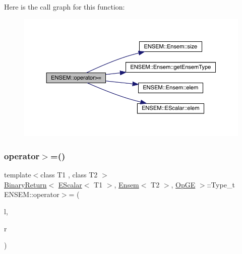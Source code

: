 Here is the call graph for this function\+:\nopagebreak
\begin{figure}[H]
\begin{center}
\leavevmode
\includegraphics[width=350pt]{d1/d9e/group__eensem_gaefcc523be9266958f63fc6b34c2671e8_cgraph}
\end{center}
\end{figure}
\mbox{\label{group__eensem_ga08b4c51fd25a40dd1d20e6138378a63d}} 
\subsubsection{\texorpdfstring{operator$>$=()}{operator>=()}\hspace{0.1cm}{\footnotesize\ttfamily [3/3]}}
{\footnotesize\ttfamily template$<$class T1 , class T2 $>$ \\
\mbox{\hyperlink{structENSEM_1_1BinaryReturn}{Binary\+Return}}$<$ \mbox{\hyperlink{classENSEM_1_1EScalar}{E\+Scalar}}$<$ T1 $>$, \mbox{\hyperlink{classENSEM_1_1Ensem}{Ensem}}$<$ T2 $>$, \mbox{\hyperlink{structENSEM_1_1OpGE}{Op\+GE}} $>$\+::Type\+\_\+t E\+N\+S\+E\+M\+::operator$>$= (\begin{DoxyParamCaption}\item[{const \mbox{\hyperlink{classENSEM_1_1EScalar}{E\+Scalar}}$<$ T1 $>$ \&}]{l,  }\item[{const \mbox{\hyperlink{classENSEM_1_1Ensem}{Ensem}}$<$ T2 $>$ \&}]{r }\end{DoxyParamCaption})\hspace{0.3cm}{\ttfamily [inline]}}

